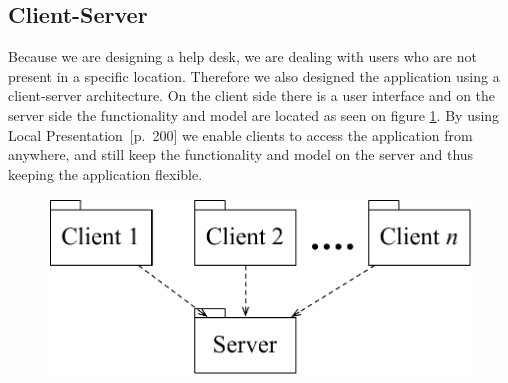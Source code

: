 \subsection{Client-Server}
Because we are designing a help desk, we are dealing with users who are not present in a specific location. Therefore we also designed the application using a client-server architecture.
On the client side there is a user interface and on the server side the functionality and model are located as seen on figure \ref{fig:client-server}. By using Local Presentation~\cite{roedeaalborg}[p.~200] we enable clients to access the application from anywhere, and still keep the functionality and model on the server and thus keeping the application flexible.         

\vspace{-1mm}
\begin{figure}[h]%
\centering
	\includegraphics[scale=0.45]{input/architectural_design/client-server-architecture-pattern.pdf}%
	\label{fig:client-server}%
\end{figure}
\vspace{-5mm}